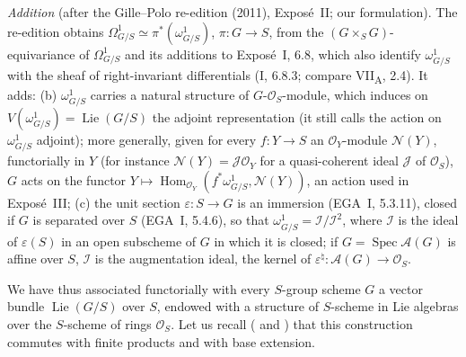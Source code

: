 \par\medskip\noindent
\emph{Addition} (after the Gille--Polo re-edition (2011), Expos\'e~II; our
formulation). The re-edition obtains
\(\Omega^1_{G/S}\simeq\pi^*(\omega^1_{G/S})\), \(\pi\colon G\to S\), from
the \((G\times_SG)\)-equivariance of \(\Omega^1_{G/S}\) and its additions to
Expos\'e~I, 6.8, which also identify \(\omega^1_{G/S}\) with the sheaf of
right-invariant differentials (I, 6.8.3; compare VII\textsubscript{A}, 2.4).
It adds: (b) \(\omega^1_{G/S}\) carries a natural structure of
\(G\)-\(\mathcal O_S\)-module, which induces on
\(V(\omega^1_{G/S})=\operatorname{Lie}(G/S)\) the adjoint representation
(it still calls the action on \(\omega^1_{G/S}\) adjoint); more generally,
given for every \(f\colon Y\to S\) an \(\mathcal O_Y\)-module
\(\mathcal N(Y)\), functorially in \(Y\) (for instance
\(\mathcal N(Y)=\mathcal J\mathcal O_Y\) for a quasi-coherent ideal
\(\mathcal J\) of \(\mathcal O_S\)), \(G\) acts on the functor
\(Y\mapsto\operatorname{Hom}_{\mathcal O_Y}(f^*\omega^1_{G/S},\mathcal N(Y))\),
an action used in Expos\'e~III; (c) the unit section
\(\varepsilon\colon S\to G\) is an immersion (EGA~I, 5.3.11), closed if \(G\)
is separated over \(S\) (EGA~I, 5.4.6), so that
\(\omega^1_{G/S}=\mathcal I/\mathcal I^2\), where \(\mathcal I\) is the ideal
of \(\varepsilon(S)\) in an open subscheme of \(G\) in which it is closed;
if \(G=\operatorname{Spec}\mathcal A(G)\) is affine over \(S\), \(\mathcal I\)
is the augmentation ideal, the kernel of
\(\varepsilon^\natural\colon\mathcal A(G)\to\mathcal O_S\).
\par\medskip

%
We have thus associated functorially with every \(S\)-group scheme \(G\) a
vector bundle \(\operatorname{Lie}(G/S)\) over \(S\), endowed with a
structure of \(S\)-scheme in Lie algebras over the \(S\)-scheme of rings
\(\mathcal O_S\). Let us recall ( and ) that this
construction commutes with finite products and with base extension.

